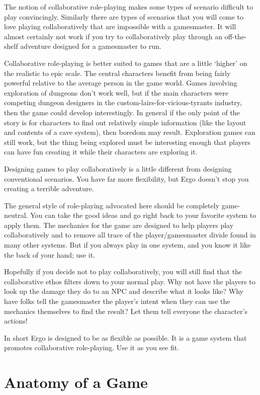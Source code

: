 \documentclass[twoside]{book}
\begin{document}
The notion of collaborative role-playing makes some types of scenario
difficult to play convincingly. Similarly there are types of scenarios
that you will come to love playing collaboratively that are impossible
with a gamesmaster. It will almost certainly not work if you try to
collaboratively play through an off-the-shelf adventure designed for a
gamesmaster to run.

Collaborative role-playing is better suited to games that are a little
`higher' on the realistic to epic scale. The central characters
benefit from being fairly powerful relative to the average person in
the game world. Games involving exploration of dungeons don't work
well, but if the main characters were competing dungeon designers in
the custom-lairs-for-vicious-tyrants industry, then the game could
develop interestingly. In general if the only point of the story is
for characters to find out relatively simple information (like the
layout and contents of a cave system), then boredom may
result. Exploration games can still work, but the thing being explored
must be interesting enough that players can have fun creating it while
their characters are exploring it.

Designing games to play collaboratively is a little different from
designing conventional scenarios. You have far more flexibility, but
Ergo doesn't stop you creating a terrible adventure.

The general style of role-playing advocated here should be completely
game-neutral. You can take the good ideas and go right back to your
favorite system to apply them. The mechanics for the game are
designed to help players play collaboratively and to remove all trace
of the player/gamesmaster divide found in many other systems. But if
you always play in one system, and you know it like the back of your
hand; use it.

Hopefully if you decide not to play collaboratively, you will still
find that the collaborative ethos filters down to your normal
play. Why not have the players to look up the damage they do to an NPC
and describe what it looks like? Why have folks tell the gamesmaster
the player's intent when they can use the mechanics themselves to find
the result? Let them tell everyone the character's actions!

In short Ergo is designed to be as flexible as possible. It is a game
system that promotes collaborative role-playing. Use it as you see
fit.

\chapter{Anatomy of a Game}
\end{document}
